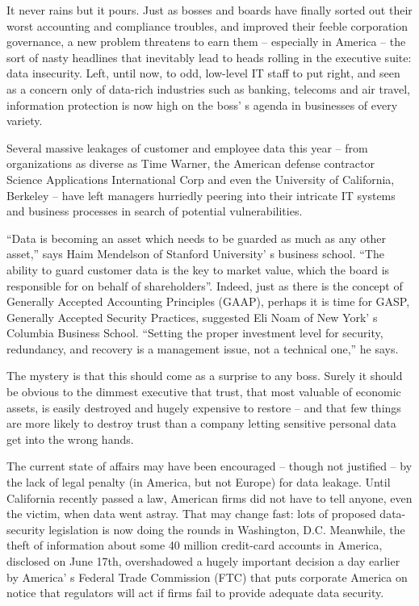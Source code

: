 It never rains but it pours. Just as bosses and boards have finally sorted out their worst accounting and compliance troubles, and improved their feeble corporation governance, a new problem threatens to earn them – especially in America – the sort of nasty headlines that inevitably lead to heads rolling in the executive suite: data insecurity. Left, until now, to odd, low-level IT staff to put right, and seen as a concern only of data-rich industries such as banking, telecoms and air travel, information protection is now high on the boss' s agenda in businesses of every variety.


Several massive leakages of customer and employee data this year – from organizations as diverse as Time Warner, the American defense contractor Science Applications International Corp and even the University of California, Berkeley – have left managers hurriedly peering into their intricate IT systems and business processes in search of potential vulnerabilities.


``Data is becoming an asset which needs to be guarded as much as any other asset,'' says Haim Mendelson of Stanford University' s business school. ``The ability to guard customer data is the key to market value, which the board is responsible for on behalf of shareholders''. Indeed, just as there is the concept of Generally Accepted Accounting Principles (GAAP), perhaps it is time for GASP, Generally Accepted Security Practices, suggested Eli Noam of New York' s Columbia Business School. ``Setting the proper investment level for security, redundancy, and recovery is a management issue, not a technical one,'' he says.


The mystery is that this should come as a surprise to any boss. Surely it should be obvious to the dimmest executive that trust, that most valuable of economic assets, is easily destroyed and hugely expensive to restore – and that few things are more likely to destroy trust than a company letting sensitive personal data get into the wrong hands.


The current state of affairs may have been encouraged – though not justified –  by the lack of legal penalty (in America, but not Europe) for data leakage. Until California recently passed a law, American firms did not have to tell anyone, even the victim, when data went astray. That may change fast: lots of proposed data-security legislation is now doing the rounds in Washington, D.C. Meanwhile, the theft of information about some 40 million credit-card accounts in America, disclosed on June 17th, overshadowed a hugely important decision a day earlier by America' s Federal Trade Commission (FTC) that puts corporate America on notice that regulators will act if firms fail to provide adequate data security.